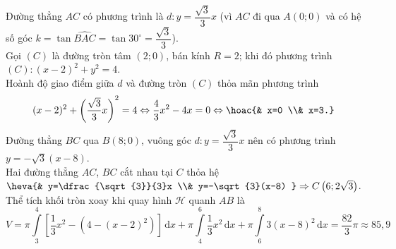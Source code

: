 \begin{ex}
{{
    }
    Đường thẳng $AC$ có phương trình là $d\colon y=\dfrac{\sqrt{3}}{3}x$ (vì $AC$ đi qua $A(0;0)$ và có hệ số góc $k=\tan \widehat{BAC}=\tan 30^{\circ }=\dfrac{\sqrt{3}}{3}$).\\
    Gọi $(C)$ là đường tròn tâm $(2;0)$, bán kính $R=2$; khi đó phương trình $(C)\colon (x-2)^2+y^2=4$.\\
    Hoành độ giao điểm giữa $d$ và đường tròn $(C)$ thỏa mãn phương trình $$(x-2)^2+\left(\dfrac{\sqrt{3}}{3}x\right)^2=4\Leftrightarrow \dfrac{4}{3}x^2-4x=0\Leftrightarrow \hoac{& x=0 \\& x=3.} $$
    Đường thẳng $BC$ qua $B(8;0)$, vuông góc $d\colon y=\dfrac{\sqrt{3}}{3}x$ nên có phương trình $y=-\sqrt{3}(x-8)$.\\
    Hai đường thẳng $AC$, $BC$ cắt nhau tại $C$ thỏa hệ $\heva{& y=\dfrac{\sqrt{3}}{3}x \\& y=-\sqrt{3}(x-8) } \Rightarrow C\left(6;2\sqrt{3}\right)$.\\
    Thể tích khối tròn xoay khi quay hình $\mathscr{H}$ quanh $AB$ là 
    $$V=\pi \int\limits_3^4{\left[\dfrac{1}{3}x^2-\left(4-(x-2)^2\right)\right]\mathrm{\,d}x}+\pi \int\limits_4^6{\dfrac{1}{3}x^2\mathrm{\,d}x}+\pi \displaystyle\int\limits_6^8{3(x-8)^2\mathrm{\,d}x}=\dfrac{82}{3}\pi \approx 85{,}9$$
}
\end{ex}
